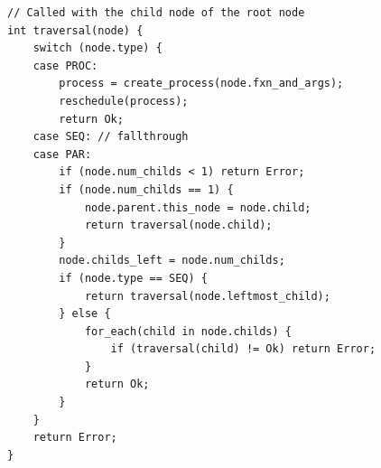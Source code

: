 
\begin{lstlisting}[style=CustomC,caption={Pseudo code for the composite process tree traversal algorithm},label={lst:algo_composite_process_tree_traversal}]
// Called with the child node of the root node
int traversal(node) {
	switch (node.type) {
	case PROC:
		process = create_process(node.fxn_and_args);
		reschedule(process);
		return Ok;
	case SEQ: // fallthrough
	case PAR:
	    if (node.num_childs < 1) return Error;
	    if (node.num_childs == 1) {
	        node.parent.this_node = node.child;
	        return traversal(node.child);
	    }
		node.childs_left = node.num_childs;
		if (node.type == SEQ) {
			return traversal(node.leftmost_child);
		} else {
		    for_each(child in node.childs) {
		    	if (traversal(child) != Ok) return Error;
		    }
		    return Ok;
		}
	}
	return Error;
}
\end{lstlisting}

